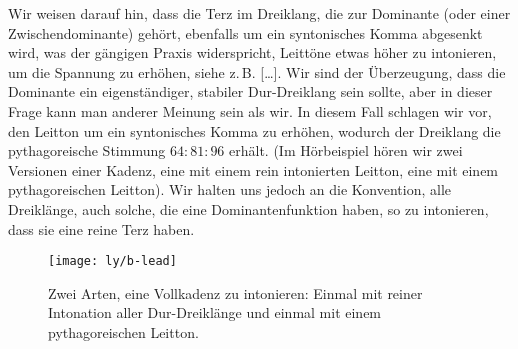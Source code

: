 \documentclass[ngerman,11pt]{scrartcl}
\begin{document}
Wir weisen darauf hin, dass die Terz im Dreiklang, die zur Dominante (oder einer
Zwischendominante) gehört, ebenfalls um ein syntonisches Komma abgesenkt wird,
was der gängigen Praxis widerspricht, Leittöne etwas höher zu intonieren, um die
Spannung zu erhöhen, siehe z.\,B. […]. Wir sind der Überzeugung,
dass die Dominante ein eigenständiger, stabiler Dur-Dreiklang sein sollte, aber
in dieser Frage kann man anderer Meinung sein als wir. In diesem Fall schlagen
wir vor, den Leitton um ein syntonisches Komma zu erhöhen, wodurch der Dreiklang
die pythagoreische Stimmung $64:81:96$ erhält. (Im Hörbeispiel hören wir zwei
Versionen einer Kadenz, eine mit einem rein intonierten Leitton, eine mit einem
pythagoreischen Leitton). Wir halten uns jedoch an die Konvention, alle
Dreiklänge, auch solche, die eine Dominantenfunktion haben, so zu intonieren,
dass sie eine reine Terz haben.

\begin{figure}
  \centering
  \texttt{[image: ly/b-lead]}
  \caption{Zwei Arten, eine Vollkadenz zu intonieren: Einmal mit reiner
  	Intonation aller Dur-Dreiklänge und einmal mit einem pythagoreischen
  	Leitton.}\label{fig:lead}
\end{figure}
\end{document}
